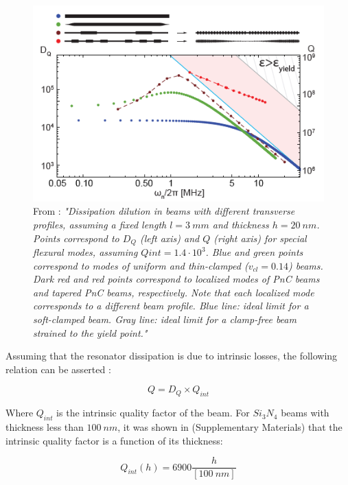 \documentclass[%
 reprint,
nofootinbib,
 amsmath,amssymb,
 aps,
]{revtex4-2}
\begin{document}
\begin{figure}
    \centering
    \includegraphics[width=\columnwidth]{D_Q_various_beam_designs.PNG}
    \caption{From \cite{generalized_dissipation_dilution}: \textit{"Dissipation dilution in beams with different transverse profiles, assuming a fixed length $l = 3 \ mm$ and thickness $h = 20 \ nm$. Points correspond to $D_Q$ (left axis) and $Q$ (right axis) for special flexural modes, assuming $Qint = 1.4 \cdot 10^3$. Blue and green points correspond to modes of uniform and thin-clamped ($v_{cl} = 0.14$) beams. Dark red and red points correspond to localized modes of PnC beams and tapered PnC beams, respectively. Note that each localized mode corresponds to a different beam profile. Blue line: ideal limit for a soft-clamped beam. Gray line: ideal limit for a clamp-free beam strained to the yield point."}}
    \label{fig:D_Q various beam designs}
\end{figure}


Assuming that the resonator dissipation is due to intrinsic losses, the following relation can be asserted \cite{generalized_dissipation_dilution}:

\begin{equation*}
    Q = D_Q \times Q_{int}
\end{equation*}

Where $Q_{int}$ is the intrinsic quality factor of the beam. For $Si_3 N_4$ beams with thickness less than $100 \ nm$, it was shown in \cite{ generalized_dissipation_dilution} (Supplementary Materials) that the intrinsic quality factor is a function of its thickness:

\begin{equation}\label{Q_int(h)}
     Q_{int}(h) = 6900 \frac{h}{[100 \ nm]}
\end{equation}
\end{document}
